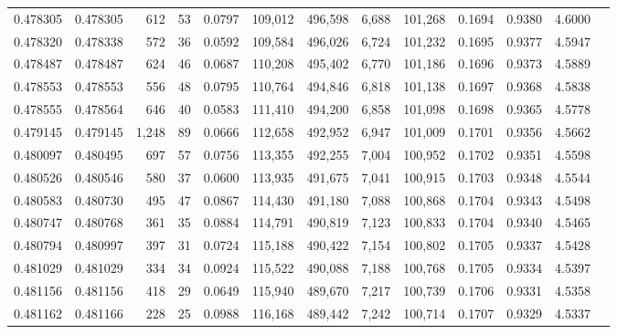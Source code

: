 \begin{tabular}{rrrrrrrrrrrrr}
0.478305 & 0.478305 &   612 &    53 &                                     0.0797 & 109,012 & 496,598 &   6,688 & 101,268 & 0.1694 & 0.9380 & 4.6000 \\
0.478320 & 0.478338 &   572 &    36 &                                     0.0592 & 109,584 & 496,026 &   6,724 & 101,232 & 0.1695 & 0.9377 & 4.5947 \\
0.478487 & 0.478487 &   624 &    46 &                                     0.0687 & 110,208 & 495,402 &   6,770 & 101,186 & 0.1696 & 0.9373 & 4.5889 \\
0.478553 & 0.478553 &   556 &    48 &                                     0.0795 & 110,764 & 494,846 &   6,818 & 101,138 & 0.1697 & 0.9368 & 4.5838 \\
0.478555 & 0.478564 &   646 &    40 &                                     0.0583 & 111,410 & 494,200 &   6,858 & 101,098 & 0.1698 & 0.9365 & 4.5778 \\
0.479145 & 0.479145 & 1,248 &    89 &                                     0.0666 & 112,658 & 492,952 &   6,947 & 101,009 & 0.1701 & 0.9356 & 4.5662 \\
0.480097 & 0.480495 &   697 &    57 &                                     0.0756 & 113,355 & 492,255 &   7,004 & 100,952 & 0.1702 & 0.9351 & 4.5598 \\
0.480526 & 0.480546 &   580 &    37 &                                     0.0600 & 113,935 & 491,675 &   7,041 & 100,915 & 0.1703 & 0.9348 & 4.5544 \\
0.480583 & 0.480730 &   495 &    47 &                                     0.0867 & 114,430 & 491,180 &   7,088 & 100,868 & 0.1704 & 0.9343 & 4.5498 \\
0.480747 & 0.480768 &   361 &    35 &                                     0.0884 & 114,791 & 490,819 &   7,123 & 100,833 & 0.1704 & 0.9340 & 4.5465 \\
0.480794 & 0.480997 &   397 &    31 &                                     0.0724 & 115,188 & 490,422 &   7,154 & 100,802 & 0.1705 & 0.9337 & 4.5428 \\
0.481029 & 0.481029 &   334 &    34 &                                     0.0924 & 115,522 & 490,088 &   7,188 & 100,768 & 0.1705 & 0.9334 & 4.5397 \\
0.481156 & 0.481156 &   418 &    29 &                                     0.0649 & 115,940 & 489,670 &   7,217 & 100,739 & 0.1706 & 0.9331 & 4.5358 \\
0.481162 & 0.481166 &   228 &    25 &                                     0.0988 & 116,168 & 489,442 &   7,242 & 100,714 & 0.1707 & 0.9329 & 4.5337 \\

\end{tabular}
